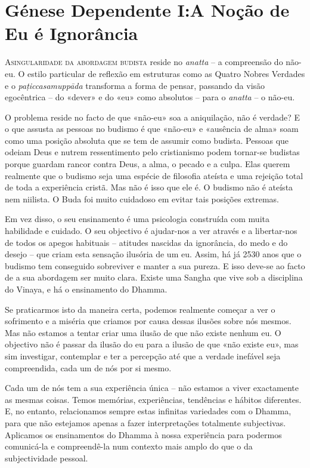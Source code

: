 \chapter{Génese Dependente I:\@ A Noção de Eu é Ignorância}

\lettrine{A}{\space singularidade da abordagem budista} reside no \emph{anatta}
-- a compreensão do não-eu. O estilo particular de reflexão em estruturas como
as Quatro Nobres Verdades e o \emph{paṭiccasamuppāda} transforma a forma de
pensar, passando da visão egocêntrica -- do «dever» e do «eu» como absolutos --
para o \emph{anatta} -- o não-eu.

O problema reside no facto de que «não-eu» soa a aniquilação, não é verdade? E
o que assusta as pessoas no budismo é que «não-eu» e «ausência de alma» soam
como uma posição absoluta que se tem de assumir como budista. Pessoas que odeiam
Deus e nutrem ressentimento pelo cristianismo podem tornar-se budistas porque
guardam rancor contra Deus, a alma, o pecado e a culpa. Elas querem realmente
que o budismo seja uma espécie de filosofia ateísta e uma rejeição total de toda
a experiência cristã. Mas não é isso que ele é. O budismo não é ateísta nem
niilista. O Buda foi muito cuidadoso em evitar tais posições extremas.

Em vez disso, o seu ensinamento é uma psicologia construída com muita habilidade
e cuidado. O seu objectivo é ajudar-nos a ver através e a libertar-nos de
todos os apegos habituais -- atitudes nascidas da ignorância, do medo e do
desejo -- que criam esta sensação ilusória de um eu. Assim, há já 2530 anos que
o budismo tem conseguido sobreviver e manter a sua pureza. E isso deve-se ao
facto de a sua abordagem ser muito clara. Existe uma Sangha que vive sob a
disciplina do Vinaya, e há o ensinamento do Dhamma.

Se praticarmos isto da maneira certa, podemos realmente começar a ver o
sofrimento e a miséria que criamos por causa dessas ilusões sobre nós mesmos.
Mas não estamos a tentar criar uma ilusão de que não existe nenhum eu. O
objectivo não é passar da ilusão do eu para a ilusão de que «não existe eu», mas
sim investigar, contemplar e ter a percepção até que a verdade inefável seja
compreendida, cada um de nós por si mesmo.

Cada um de nós tem a sua experiência única -- não estamos a viver exactamente as
mesmas coisas. Temos memórias, experiências, tendências e hábitos diferentes. E,
no entanto, relacionamos sempre estas infinitas variedades com o Dhamma, para
que não estejamos apenas a fazer interpretações totalmente subjectivas.
Aplicamos os ensinamentos do Dhamma à nossa experiência para podermos
comunicá-la e compreendê-la num contexto mais amplo do que o da subjectividade
pessoal.

